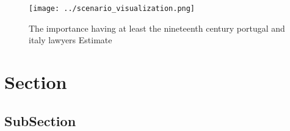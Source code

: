 \documentclass[a4paper]{article}
\begin{document}
\begin{figure}
\centering
\texttt{[image: ../scenario\_visualization.png]}
\caption{The importance having at least the nineteenth century portugal and italy lawyers Estimate
}
\end{figure}
 
\section{Section}

\subsection{SubSection}
\end{document}
